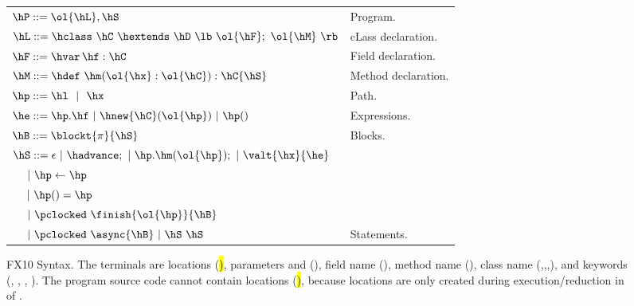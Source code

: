 \begin{figure*}[t]
\begin{center}
\begin{tabular}{|l|l|}
\hline

$\hP ::= \ol{\hL},\hS$ & Program. \\

$\hL ::= \hclass ~ \hC~\hextends~\hD~\lb~\ol{\hF};~\ol{\hM}~\rb$
& cLass declaration. \\

$\hF ::= \hvar\,\hf:\hC$
& Field declaration. \\

$\hM ::= \hdef\ \hm(\ol{\hx}:\ol{\hC}):\hC\{\hS\}$
& Method declaration. \\

$\hp ::= \hl ~~|~~ \hx$
& Path. \\ %

$\he ::=  \hp.\hf  ~|~ \hnew{\hC}(\ol{\hp}) ~|~ \hp()$
& Expressions. \\ %
$\hB ::= \blockt{\pi}{\hS}$
& Blocks. \\
$\hS ::=  \epsilon ~|~ \hadvance; ~|~ \hp.\hm(\ol{\hp});  ~|~ \valt{\hx}{\he}$ &\\
$~~~~|~ \hp \leftarrow \hp$ &\\
$~~~~|~ \hp() = \hp$ &\\
$~~~~|~ \pclocked~\finish{\ol{\hp}}{\hB}$&\\
$~~~~|~ \pclocked~\async{\hB}~|~ \hS~\hS$
& Statements. \\ %

\hline
\end{tabular}
\end{center}
FX10 Syntax.
    The terminals are locations (\hl), parameters and \hthis (\hx), field name (\hf), method name (\hm), class name (\hB,\hC,\hD,\hObject),
        and keywords (\hhnew, \hfinish, \hasync, ).
    The program source code cannot contain locations (\hl), because locations are only created during execution/reduction in  of .

\label{Figure:syntax}



\end{figure*}
